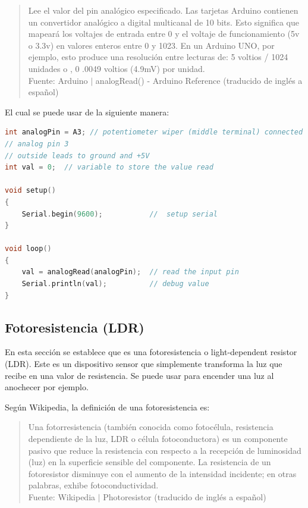\documentclass{article}
\begin{document}
\begin{quote}
Lee el valor del pin analógico especificado. Las tarjetas Arduino contienen
un convertidor analógico a digital multicanal de 10 bits. Esto significa que
mapeará los voltajes de entrada entre 0 y el voltaje de funcionamiento (5v o
3.3v) en valores enteros entre 0 y 1023. En un Arduino UNO, por ejemplo, esto
produce una resolución entre lecturas de: 5 voltios / 1024 unidades o , 0
.0049 voltios (4.9mV) por unidad. \\ \footnotesize
Fuente: Arduino $\mid$ analogRead() - Arduino Reference (traducido de inglés
a español) \cite{arduino-analogRead}
\end{quote}

El cual se puede usar de la siguiente manera:

\begin{lstlisting}[language=C, caption=Uso del método analogRead.
\footnotesize Fuente: analogRead() - Arduino Reference
\cite{arduino-analogRead}]
int analogPin = A3; // potentiometer wiper (middle terminal) connected to
// analog pin 3
// outside leads to ground and +5V
int val = 0;  // variable to store the value read

void setup()
{
    Serial.begin(9600);           //  setup serial
}

void loop()
{
    val = analogRead(analogPin);  // read the input pin
    Serial.println(val);          // debug value
}
\end{lstlisting}

\subsection{Fotoresistencia (LDR)}

En esta sección se establece que es una fotoresistencia o light-dependent
resistor (LDR). Este es un dispositivo sensor que simplemente transforma la
luz que recibe en una valor de resistencia. Se puede usar para encender una
luz al anochecer por ejemplo.

\bigbreak

Según Wikipedia, la definición de una fotoresistencia es:

\begin{quote}
Una fotorresistencia (también conocida como fotocélula, resistencia
dependiente de la luz, LDR o célula fotoconductora) es un componente pasivo
que reduce la resistencia con respecto a la recepción de luminosidad (luz) en
la superficie sensible del componente. La resistencia de un fotoresistor
disminuye con el aumento de la intensidad incidente; en otras palabras,
exhibe fotoconductividad.\\ \footnotesize
Fuente: Wikipedia $\mid$ Photoresistor (traducido de inglés a español)
\cite{wikipedia-ldr-2022}
\end{quote}
\end{document}
